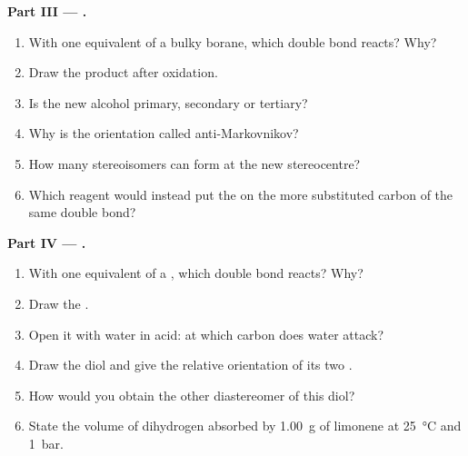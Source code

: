 \begin{problem}
\medskip
\noindent\textbf{Part III --- .}
\begin{enumerate}[resume]
  \item With one equivalent of a bulky borane, which double bond reacts? Why?
  \item Draw the product after oxidation.
  \item Is the new alcohol primary, secondary or tertiary?
  \item Why is the orientation called anti-Markovnikov?
  \item How many stereoisomers can form at the new stereocentre?
  \item Which reagent would instead put the  on the more substituted carbon of the
        same double bond?
\end{enumerate}

\medskip
\noindent\textbf{Part IV --- .}
\begin{enumerate}[resume]
  \item With one equivalent of a , which double bond reacts? Why?
  \item Draw the .
  \item Open it with water in acid: at which carbon does water attack?
  \item Draw the diol and give the relative orientation of its two .
  \item How would you obtain the other diastereomer of this diol?
  \item State the volume of dihydrogen absorbed by \qty{1.00}{g} of limonene at
        \qty{25}{\degreeCelsius} and \qty{1}{bar}.
\end{enumerate}
\end{problem}
